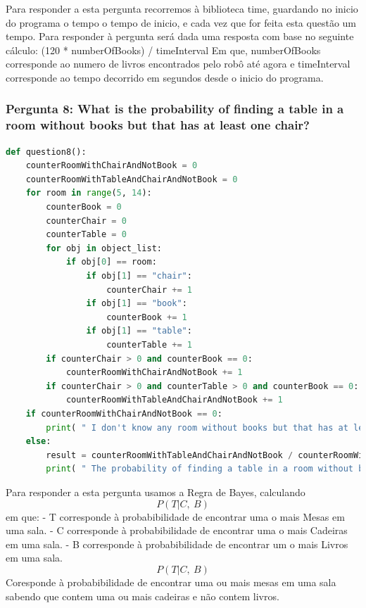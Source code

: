 \documentclass{article}
\begin{document}
Para responder a esta pergunta recorremos à biblioteca time, guardando no inicio do programa o tempo o tempo de inicio, e cada vez que for feita esta questão um tempo. Para responder à pergunta será dada uma resposta com base no seguinte cálculo:
\newline (120 * numberOfBooks) / timeInterval
\newline Em que, numberOfBooks corresponde ao numero de livros encontrados pelo robô até agora e timeInterval corresponde ao tempo decorrido em segundos desde o inicio do programa.

\subsubsection{Pergunta 8: What is the probability of finding a table in a room without books but that
has at least one chair?}
\begin{lstlisting}[language=Python]
  def question8():
	counterRoomWithChairAndNotBook = 0
	counterRoomWithTableAndChairAndNotBook = 0
	for room in range(5, 14):
		counterBook = 0
		counterChair = 0
		counterTable = 0
		for obj in object_list:
			if obj[0] == room:
				if obj[1] == "chair":
					counterChair += 1
				if obj[1] == "book":
					counterBook += 1
				if obj[1] == "table":
					counterTable += 1
		if counterChair > 0 and counterBook == 0:
			counterRoomWithChairAndNotBook += 1
		if counterChair > 0 and counterTable > 0 and counterBook == 0:
			counterRoomWithTableAndChairAndNotBook += 1
	if counterRoomWithChairAndNotBook == 0:
		print( " I don't know any room without books but that has at least one chair yet. " )
	else:
		result = counterRoomWithTableAndChairAndNotBook / counterRoomWithChairAndNotBook
		print( " The probability of finding a table in a room without books but that has at least one chair is %d. " % result )
\end{lstlisting}

Para responder a esta pergunta usamos a Regra de Bayes, calculando \[P(T | C, ~B)\] em que:
\newline - T corresponde à probabibilidade de encontrar uma o mais Mesas em uma sala.
\newline - C corresponde à probabibilidade de encontrar uma o mais Cadeiras em uma sala.
\newline - B corresponde à probabibilidade de encontrar um o mais Livros em uma sala.
\newline \[P(T | C, ~B)\] Coresponde à probabibilidade de encontrar uma ou mais mesas em uma sala sabendo que contem uma ou mais cadeiras e não contem livros. 
\end{document}
